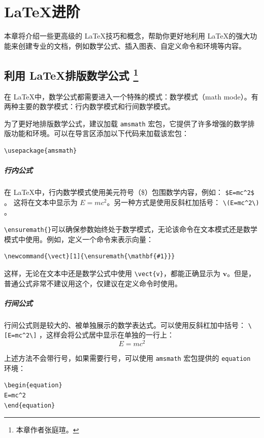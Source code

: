 \chapter{\LaTeX 进阶}\label{sec:latex-advanced}

本章将介绍一些更高级的 \LaTeX 技巧和概念，帮助你更好地利用 \LaTeX 的强大功能来创建专业的文档，例如数学公式、插入图表、自定义命令和环境等内容。

\section[利用 \LaTeX 排版数学公式]{利用 \LaTeX 排版数学公式%
  \protect\footnote{本章作者张庭瑄。}}
在 \LaTeX 中，数学公式都需要进入一个特殊的模式：数学模式（math mode）。有两种主要的数学模式：行内数学模式和行间数学模式。

为了更好地排版数学公式，建议加载 \texttt{amsmath} 宏包，它提供了许多增强的数学排版功能和环境。可以在导言区添加以下代码来加载该宏包：
\begin{verbatim}
\usepackage{amsmath}
\end{verbatim}

\paragraph{行内公式}

在 \LaTeX 中，行内数学模式使用美元符号（\$）包围数学内容，例如： \verb|$E=mc^2$| 。 这将在文本中显示为 \(E=mc^2\)。另一种方式是使用反斜杠加括号： \verb|\(E=mc^2\)| 。

\verb|\ensuremath{}|可以确保参数始终处于数学模式，无论该命令在文本模式还是数学模式中使用。例如，定义一个命令来表示向量：
\begin{verbatim}
\newcommand{\vect}[1]{\ensuremath{\mathbf{#1}}}
\end{verbatim}
这样，无论在文本中还是数学公式中使用 \verb|\vect{v}|，都能正确显示为 \(\mathbf{v}\)。但是，普通公式非常不建议用这个，仅建议在定义命令时使用。

\paragraph{行间公式}
行间公式则是较大的、被单独展示的数学表达式。可以使用反斜杠加中括号： \verb|\[E=mc^2\]| ，这样会将公式居中显示在单独的一行上：
\[E=mc^2\]

上述方法不会带行号，如果需要行号，可以使用 \texttt{amsmath} 宏包提供的 \texttt{equation} 环境：
\begin{verbatim}
\begin{equation}
E=mc^2
\end{equation}
\end{verbatim}

